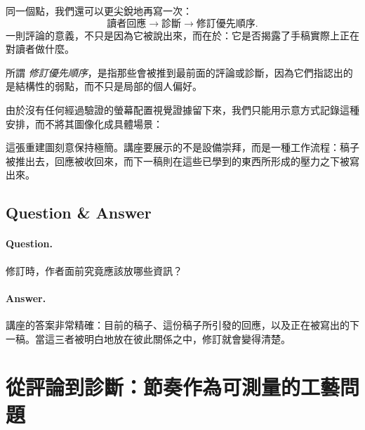 同一個點，我們還可以更尖銳地再寫一次：
\begin{equation}
\text{讀者回應} \to \text{診斷} \to \text{修訂優先順序}.
\end{equation}
一則評論的意義，不只是因為它被說出來，而在於：它是否揭露了手稿實際上正在對讀者做什麼。

\begin{definition}
所謂 \emph{修訂優先順序}，是指那些會被推到最前面的評論或診斷，因為它們指認出的是結構性的弱點，而不只是局部的個人偏好。
\end{definition}

由於沒有任何經過驗證的螢幕配置視覺證據留下來，我們只能用示意方式記錄這種安排，而不將其圖像化成具體場景：

\begin{figure}[h]
\centering
{}
\end{figure}

這張重建圖刻意保持極簡。講座要展示的不是設備崇拜，而是一種工作流程：稿子被推出去，回應被收回來，而下一稿則在這些已學到的東西所形成的壓力之下被寫出來。

\subsection{Question \& Answer}

\paragraph{Question.} 修訂時，作者面前究竟應該放哪些資訊？

\paragraph{Answer.} 講座的答案非常精確：目前的稿子、這份稿子所引發的回應，以及正在被寫出的下一稿。當這三者被明白地放在彼此關係之中，修訂就會變得清楚。

\section{從評論到診斷：節奏作為可測量的工藝問題}

